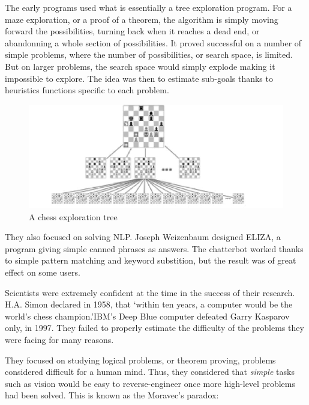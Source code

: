 \documentclass[12pt]{article}
\begin{document}
The early programs used what is essentially a tree exploration program. For a maze
exploration, or a proof of a theorem, the algorithm is simply moving forward the
possibilities, turning back when it reaches a dead end, or abandonning a whole
section of possibilities. It proved successful on a number of simple problems,
where the number of possibilities, or search space, is limited. But on larger
problems, the search space would simply explode making it impossible to explore.
The idea was then to estimate sub-goals thanks to heuristics functions specific to
each problem.

\begin{figure}[h]
    \centering
    \includegraphics[width=\textwidth]{chess-tree}
    \caption{A chess exploration tree}
    \label{fig:chess_tree}
\end{figure}

\smallskip

They also focused on solving \gls{NLP}. Joseph Weizenbaum designed ELIZA, a
program giving simple canned phrases as answers. The chatterbot worked thanks to
simple  pattern matching and keyword substition, but the result was of great
effect on some users.

Scientists were extremely confident at the time in the success of their research.
H.A. Simon declared in 1958, that \lq within ten years, a computer would be the
world's chess champion.\rq IBM's Deep Blue computer defeated Garry Kasparov only,
in 1997. They failed to properly estimate the difficulty of the problems they were
facing for many reasons.

They focused on studying logical problems, or theorem proving, problems considered
difficult for a human mind. Thus, they considered that {\em simple} tasks such as
vision would be easy to reverse-engineer once more high-level problems had been
solved. This is known as the Moravec's paradox:
\end{document}
